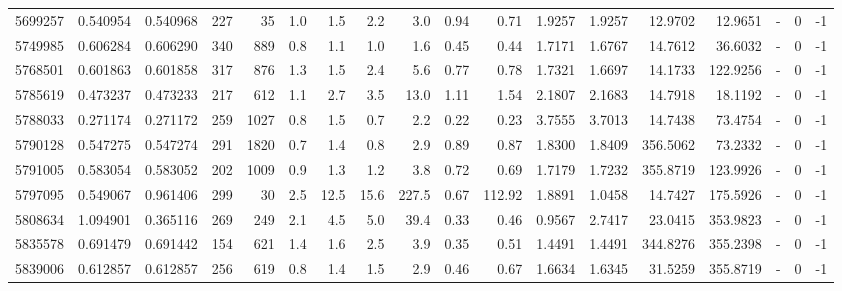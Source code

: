 \begin{tabular}{rrrrrrrrrrrrrrrlrr}
   5699257 & 0.540954 &   0.540968 &  227 &   35 &      1.0 &      1.5 &     2.2 &      3.0 &       0.94 &        0.71 &  1.9257 &  1.9257 &   12.9702 &   12.9651 &             - &        0 &         -1 \\
   5749985 & 0.606284 &   0.606290 &  340 &  889 &      0.8 &      1.1 &     1.0 &      1.6 &       0.45 &        0.44 &  1.7171 &  1.6767 &   14.7612 &   36.6032 &             - &        0 &         -1 \\
   5768501 & 0.601863 &   0.601858 &  317 &  876 &      1.3 &      1.5 &     2.4 &      5.6 &       0.77 &        0.78 &  1.7321 &  1.6697 &   14.1733 &  122.9256 &             - &        0 &         -1 \\
   5785619 & 0.473237 &   0.473233 &  217 &  612 &      1.1 &      2.7 &     3.5 &     13.0 &       1.11 &        1.54 &  2.1807 &  2.1683 &   14.7918 &   18.1192 &             - &        0 &         -1 \\
   5788033 & 0.271174 &   0.271172 &  259 & 1027 &      0.8 &      1.5 &     0.7 &      2.2 &       0.22 &        0.23 &  3.7555 &  3.7013 &   14.7438 &   73.4754 &             - &        0 &         -1 \\
   5790128 & 0.547275 &   0.547274 &  291 & 1820 &      0.7 &      1.4 &     0.8 &      2.9 &       0.89 &        0.87 &  1.8300 &  1.8409 &  356.5062 &   73.2332 &             - &        0 &         -1 \\
   5791005 & 0.583054 &   0.583052 &  202 & 1009 &      0.9 &      1.3 &     1.2 &      3.8 &       0.72 &        0.69 &  1.7179 &  1.7232 &  355.8719 &  123.9926 &             - &        0 &         -1 \\
   5797095 & 0.549067 &   0.961406 &  299 &   30 &      2.5 &     12.5 &    15.6 &    227.5 &       0.67 &      112.92 &  1.8891 &  1.0458 &   14.7427 &  175.5926 &             - &        0 &         -1 \\
   5808634 & 1.094901 &   0.365116 &  269 &  249 &      2.1 &      4.5 &     5.0 &     39.4 &       0.33 &        0.46 &  0.9567 &  2.7417 &   23.0415 &  353.9823 &             - &        0 &         -1 \\
   5835578 & 0.691479 &   0.691442 &  154 &  621 &      1.4 &      1.6 &     2.5 &      3.9 &       0.35 &        0.51 &  1.4491 &  1.4491 &  344.8276 &  355.2398 &             - &        0 &         -1 \\
   5839006 & 0.612857 &   0.612857 &  256 &  619 &      0.8 &      1.4 &     1.5 &      2.9 &       0.46 &        0.67 &  1.6634 &  1.6345 &   31.5259 &  355.8719 &             - &        0 &         -1 \\

\end{tabular}
